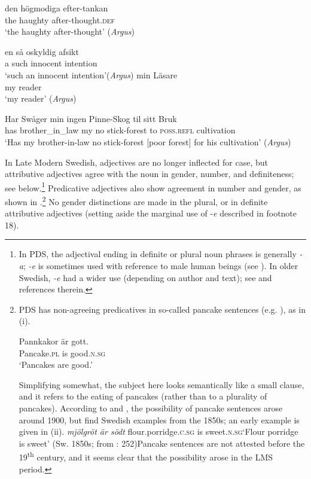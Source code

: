\documentclass[output=paper]{langscibook}
\begin{document}
\ea \label{ex:intro:33}
\ea \label{ex:intro:33a}
\gll  den högmodiga     efter-tankan \\
the  haughty   after-thought\textsc{.def}\\
\glt ‘the haughty after-thought’ (\textit{Argus})

\ex \label{ex:intro:33b}
\gll en så     oskyldig   afsikt\\
    a   such  innocent   intention\\
\glt `such an innocent intention’(\textit{Argus})
\z
\ex \label{ex:intro:34}
\ea \label{ex:intro:34a}
\gll  min Läsare \\
my   reader \\
\glt        ‘my reader’ (\textit{Argus})

\ex \label{ex:intro:34b}
\gll Har Swåger       min   ingen Pinne-Skog   til sitt       Bruk\\
 has  brother\_in\_law  my  no    stick-forest    to  \textsc{poss.refl}  cultivation\\
\glt        ‘Has my brother-in-law no stick-forest [poor forest] for his cultivation’ (\textit{Argus})
\z
\z

In Late Modern Swedish, adjectives are no longer inflected for case, but attributive adjectives agree with the noun in gender, number, and definiteness; see  below.\footnote{In PDS, the adjectival ending in definite or plural noun phrases is generally \textit{{}-a}; \textit{{}-e} is sometimes used with reference to male human beings (see \citealt{Bylin2016}). In older Swedish, \textit{{}-e} had a wider use (depending on author and text); see \citet{Larsson2004} and references therein.}  Predicative adjectives also show agreement in number and gender, as shown in .\footnote{PDS has non-agreeing predicatives in so-called pancake sentences (e.g. \citealt{Josefsson2009}), as in (i).

\ea
\gll  Pannkakor   är   gott. \\
Pancake\textsc{.pl}  is   good\textsc{.n.sg}\\
\glt ‘Pancakes are good.’
\z

Simplifying somewhat, the subject here looks semantically like a small clause, and it refers to the eating of pancakes (rather than to a plurality of pancakes). According to \citet{Faarlund1977} and \citet{Josefsson2014}, the possibility of pancake sentences arose around 1900, but \citet{HaugenEtAl2019} find Swedish examples from the 1850s; an early example is given in (ii).
\textit{mjölgröt     är södt}
flour.porridge\textsc{.c.sg}   is sweet\textsc{.n.sg}\textsc{‘}Flour porridge is sweet’ (Sw. 1850s; from \citealt{HaugenEtAl2019}: 252)Pancake sentences are not attested before the 19\textsuperscript{th} century, and it seems clear that the possibility arose in the LMS period.} No gender distinctions are made in the plural, or in definite attributive adjectives (setting aside the marginal use of -\textit{e} described in footnote 18).
\end{document}
